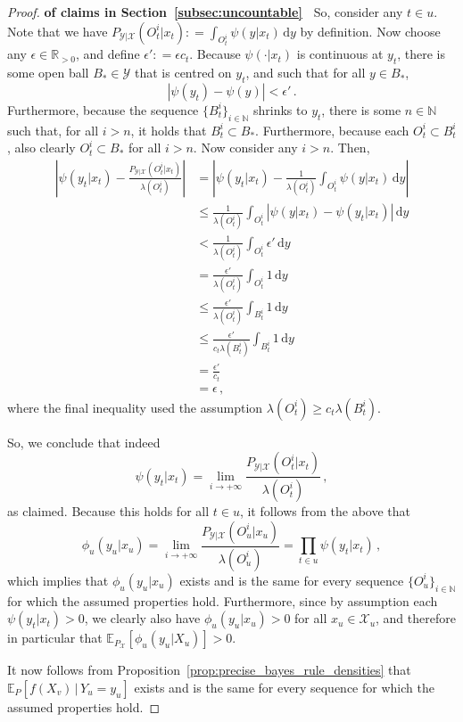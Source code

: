 \documentclass[twoside,11pt]{article}
\newcommand{\nats}{\mathbb{N}}
\newcommand{\reals}{\mathbb{R}}
\newcommand{\realspos}{\reals_{>0}}
\newcommand{\states}{\mathcal{X}}
\newcommand{\observs}{\mathcal{Y}}
\newcommand{\abs}[1]{\left\vert #1 \right\vert}
\newcommand{\coloneqq}{:\!=}
\begin{document}
\begin{proof}{\bf of claims in Section~\ref{subsec:uncountable}~}
So, consider any $t\in u$. Note that we have $P_{\observs\vert\states}(O_t^i\vert x_t)\coloneqq \int_{O_t^i}\psi(y\vert x_t)\,\mathrm{d}y$ by definition. Now choose any $\epsilon\in\realspos$, and define $\epsilon'\coloneqq\epsilon c_t$. Because $\psi(\cdot\vert x_t)$ is continuous at $y_t$, there is some open ball $B_*\in\observs$ that is centred on $y_t$, and such that for all $y\in B_*$,
\begin{equation*}
\abs{\psi(y_t) - \psi(y)} < \epsilon'\,.
\end{equation*}
Furthermore, because the sequence $\{B_t^i\}_{i\in\nats}$ shrinks to $y_t$, there is some $n\in\nats$ such that, for all $i>n$, it holds that $B_t^i\subset B_*$. Furthermore, because each $O_t^i\subset B_t^i$, also clearly $O_t^i\subset B_*$ for all $i>n$. Now consider any $i>n$. Then,
\begin{align*}
\abs{\psi(y_t\vert x_t) - \frac{P_{\observs\vert\states}(O_t^i\vert x_t)}{\lambda(O_t^i)}} &= \abs{\psi(y_t\vert x_t) - \frac{1}{\lambda(O_t^i)}\int_{O_t^i}\psi(y\vert x_t)\,\mathrm{d}y} \\
 &\leq \frac{1}{\lambda(O_t^i)}\int_{O_t^i}\abs{\psi(y\vert x_t) - \psi(y_t\vert x_t)}\,\mathrm{d}y \\
 &< \frac{1}{\lambda(O_t^i)}\int_{O_t^i}\epsilon'\,\mathrm{d}y \\
 &= \frac{\epsilon'}{\lambda(O_t^i)}\int_{O_t^i}1\,\mathrm{d}y \\
 &\leq \frac{\epsilon'}{\lambda(O_t^i)}\int_{B_t^i}1\,\mathrm{d}y \\
 &\leq \frac{\epsilon'}{c_t\lambda(B_t^i)}\int_{B_t^i}1\,\mathrm{d}y \\
 &= \frac{\epsilon'}{c_t} \\
 &= \epsilon\,,
\end{align*}
where the final inequality used the assumption $\lambda(O_t^i)\geq c_t\lambda(B_t^i)$. 

So, we conclude that indeed
\begin{equation*}
\psi(y_t\vert x_t) = \lim_{i\to+\infty}\frac{P_{\observs\vert\states}(O_t^i\vert x_t)}{\lambda(O_t^i)}\,,
\end{equation*}
as claimed. Because this holds for all $t\in u$, it follows from the above that
\begin{equation*}
\phi_u(y_u\vert x_u) = \lim_{i\to+\infty}\frac{P_{\observs\vert\states}(O_u^i\vert x_u)}{\lambda(O_u^i)} = \prod_{t\in u}\psi(y_t\vert x_t)\,,
\end{equation*}
which implies that $\phi_u(y_u\vert x_u)$ exists and is the same for every sequence $\{O_u^i\}_{i\in\nats}$ for which the assumed properties hold. Furthermore, since by assumption each $\psi(y_t\vert x_t)>0$, we clearly also have $\phi_u(y_u\vert x_u)>0$ for all $x_u\in\states_u$, and therefore in particular that $\mathbb{E}_{P_\states}[\phi_u(y_u\vert X_u)]>0$. 

It now follows from Proposition~\ref{prop:precise_bayes_rule_densities} that $\mathbb{E}_P[f(X_v)\,\vert\,Y_u=y_u]$ exists and is the same for every sequence for which the assumed properties hold.
\end{proof}
\end{document}
